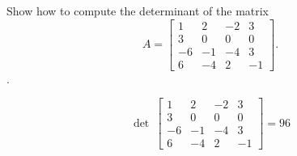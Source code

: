 
\begin{exerciseStatement}


Show how to compute the determinant of the matrix \[A= \left[\begin{array}{cccc}
1 & 2 & -2 & 3 \\
3 & 0 & 0 & 0 \\
-6 & -1 & -4 & 3 \\
6 & -4 & 2 & -1
\end{array}\right] .\].


\end{exerciseStatement}
    
\begin{exerciseAnswer} 
\[\operatorname{det}\  \left[\begin{array}{cccc}
1 & 2 & -2 & 3 \\
3 & 0 & 0 & 0 \\
-6 & -1 & -4 & 3 \\
6 & -4 & 2 & -1
\end{array}\right] = 96 \]
\end{exerciseAnswer}
    
